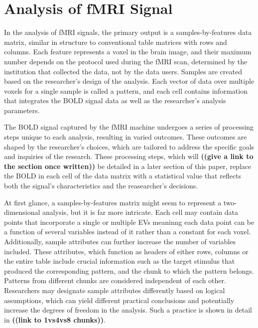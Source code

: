 \section{Analysis of fMRI Signal} %

In the analysis of \gls{fMRI} signals, the primary output is a samples-by-features data matrix, similar in structure to conventional table matrices with rows and columns. Each feature represents a voxel in the brain image, and their maximum number depends on the protocol used during the \gls{fMRI} scan, determined by the institution that collected the data, not by the data users. Samples are created based on the researcher's design of the analysis. Each vector of data over multiple voxels for a single sample is called a pattern, and each cell contains information that integrates the \gls{BOLD} signal data as well as the researcher's analysis parameters.

The \gls{BOLD} signal captured by the \gls{fMRI} machine undergoes a series of processing steps unique to each analysis, resulting in varied outcomes. These outcomes are shaped by the researcher's choices, which are tailored to address the specific goals and inquiries of the research. These processing steps, which will \textbf{((give a link to the section once written))} be detailed in a later section of this paper, replace the \gls{BOLD} in each cell of the data matrix with a statistical value that reflects both the signal's characteristics and the reasearcher's decisions.

At first glance, a samples-by-features matrix might seem to represent a two-dimensional analysis, but it is far more intricate. Each cell may contain data points that incorporate a single or multiple \gls{EVs} meaninng each data point can be a function of several variables instead of it rather than a constant for each voxel. Additionally, sample attributes can further increase the number of variables included. These attributes, which function as headers of either rows, columns or the entire table include crucial information such as the target stimulus that produced the corresponding pattern, and the chunk to which the pattern belongs. Patterns from different chunks are considered independent of each other. Researchers may designate sample attributes differently based on logical assumptions, which can yield different practical conclusions and potentially increase the degrees of freedom in the analysis. Such a practice is shown in detail in \textbf{((link to 1vs4vs8 chunks))}. 

